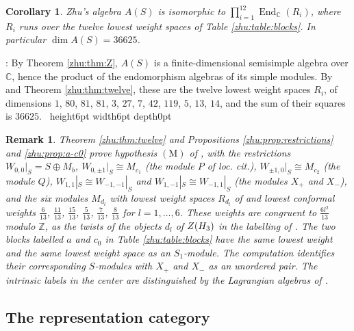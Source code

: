 \documentclass[leqno]{article}
\newcommand{\Cbb}{\ensuremath{\mathbb{C}}}
\let\cal\relax
\newcommand{\cal}{\mathcal}
\newcommand{\Z}{\ensuremath{\mathbb{Z}}}
\newcommand{\qed}{\hfill \vrule height6pt  width6pt depth0pt}
\newtheorem{cor}[thm]{Corollary}
\newtheorem{remark}[thm]{Remark}
\newenvironment{proof}[1][]{\noindent {\it Proof #1} : }{\hbox{~}\qed
\smallskip
}
\numberwithin{equation}{section}
\begin{document}
\begin{cor}
\label{zhu:cor:dimension}
Zhu's algebra $A(S)$ is isomorphic to $\prod_{i=1}^{12} \operatorname{End}_\Cbb(R_i)$, where $R_i$ runs over the twelve lowest weight spaces of Table \ref{zhu:table:blocks}. In particular $\dim A(S) = 36625$.
\end{cor}

\begin{proof}
By Theorem \ref{zhu:thm:Z}, $A(S)$ is a finite-dimensional semisimple algebra over $\Cbb$, hence the product of the endomorphism algebras of its simple modules. By \cite[Theorem 2.2.2 p.~261]{Zhu96} and Theorem \ref{zhu:thm:twelve}, these are the twelve lowest weight spaces $R_i$, of dimensions $1$, $80$, $81$, $81$, $3$, $27$, $7$, $42$, $119$, $5$, $13$, $14$, and the sum of their squares is $36625$.
\end{proof}

\begin{remark} \normalfont
\label{zhu:rem:M-proved}
Theorem \ref{zhu:thm:twelve} and Propositions \ref{zhu:prop:restrictions} and \ref{zhu:prop:a-c0} prove hypothesis $\mathrm{(M)}$ of \cite[Remark 11.2]{Arh26}, with the restrictions $W_{0,0}|_S = S \oplus M_b$, $W_{0,\pm1}|_S \cong M_{c_1}$ (the module $P$ of loc. cit.), $W_{\pm1,0}|_S \cong M_{c_2}$ (the module $Q$), $W_{1,1}|_S \cong W_{-1,-1}|_S$ and $W_{1,-1}|_S \cong W_{-1,1}|_S$ (the modules $X_+$ and $X_-$), and the six modules $M_{d_l}$ with lowest weight spaces $R_{d_l}$ of \cite[Table 2]{Arh26} and lowest conformal weights $\frac{6}{13}$, $\frac{11}{13}$, $\frac{15}{13}$, $\frac{5}{13}$, $\frac{7}{13}$, $\frac{8}{13}$ for $l = 1, \ldots, 6$. These weights are congruent to $\frac{6l^2}{13}$ modulo $\Z$, as the twists of the objects $d_l$ of $Z(\cal H_3)$ in the labelling of \cite{EvG11}. The two blocks labelled $a$ and $c_0$ in Table \ref{zhu:table:blocks} have the same lowest weight and the same lowest weight space as an $S_1$-module. The computation identifies their corresponding $S$-modules with $X_+$ and $X_-$ as an unordered pair. The intrinsic labels in the center are distinguished by the Lagrangian algebras of \cite[Proposition 3.6 and Remark 3.7]{ArhII}.
\end{remark}
\subsection{The representation category}
\label{zhu:sec:categorical}
\end{document}

